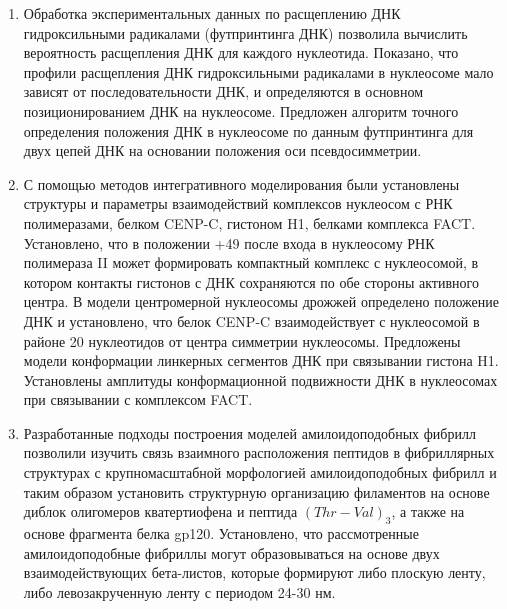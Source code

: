 \begin{enumerate}
  

  \item Обработка экспериментальных данных по расщеплению ДНК гидроксильными радикалами (футпринтинга ДНК) позволила вычислить вероятность расщепления ДНК для каждого нуклеотида. Показано, что профили расщепления ДНК гидроксильными радикалами в нуклеосоме мало зависят от последовательности ДНК, и определяются в основном позиционированием ДНК на нуклеосоме. Предложен алгоритм точного определения положения ДНК в нуклеосоме по данным футпринтинга для двух цепей ДНК на основании положения оси псевдосимметрии.

  \item С помощью методов интегративного моделирования были установлены структуры и параметры взаимодействий комплексов нуклеосом с РНК полимеразами, белком CENP-C, гистоном H1, белками комплекса FACT. Установлено, что в положении +49 после входа в нуклеосому РНК полимераза II может формировать компактный комплекс с нуклеосомой, в котором контакты гистонов с ДНК сохраняются по обе стороны активного центра. В модели центромерной нуклеосомы дрожжей определено положение ДНК и установлено, что белок CENP-C взаимодействует с нуклеосомой в районе 20 нуклеотидов от центра симметрии нуклеосомы. Предложены модели конформации линкерных сегментов ДНК при связывании гистона H1.  Установлены амплитуды конформационной подвижности ДНК в нуклеосомах при связывании с комплексом FACT.
  

 \item Разработанные подходы построения моделей амилоидоподобных фибрилл позволили изучить связь взаимного расположения пептидов в фибриллярных структурах с крупномасштабной морфологией амилоидоподобных фибрилл и таким образом установить структурную организацию филаментов на основе диблок олигомеров кватертиофена и пептида $(Thr-Val)_3$, а также на основе фрагмента белка gp120. Установлено, что рассмотренные амилоидоподобные фибриллы могут образовываться на основе двух взаимодействующих бета-листов, которые формируют либо плоскую ленту, либо левозакрученную ленту с периодом 24-30 нм.

\end{enumerate}


